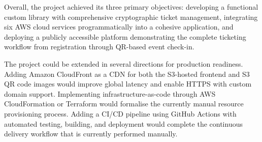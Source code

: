 \documentclass[conference]{IEEEtran}
\begin{document}
Overall, the project achieved its three primary objectives: developing a functional custom library with comprehensive cryptographic ticket management, integrating six AWS cloud services programmatically into a cohesive application, and deploying a publicly accessible platform demonstrating the complete ticketing workflow from registration through QR-based event check-in.

The project could be extended in several directions for production readiness. Adding Amazon CloudFront as a CDN for both the S3-hosted frontend and S3 QR code images would improve global latency and enable HTTPS with custom domain support. Implementing infrastructure-as-code through AWS CloudFormation or Terraform would formalise the currently manual resource provisioning process. Adding a CI/CD pipeline using GitHub Actions with automated testing, building, and deployment would complete the continuous delivery workflow that is currently performed manually.
\end{document}
